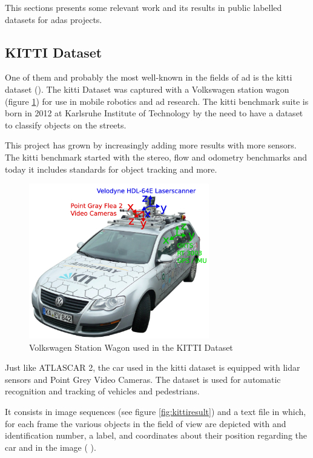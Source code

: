 This sections presents some relevant work and its results in public labelled datasets for \gls{adas} projects.

\subsection{KITTI Dataset}
One of them and probably the most well-known in the fields of \gls{ad} is the \gls{kitti} dataset (\cite{KarlsruheInstituteofTechnology}). The \gls{kitti} Dataset was captured with a Volkswagen station wagon (figure \ref{fig:kitticar}) for use in mobile robotics and \gls{ad} research. The \gls{kitti} benchmark suite is born in 2012 at Karlsruhe Institute of Technology by the need to have a dataset to classify objects on the streets. 

This project has grown by increasingly adding more results with more sensors. The \gls{kitti} benchmark started with the stereo, flow and odometry benchmarks and today it includes standards for object tracking and more. 

\begin{figure}[htp]
	
	\centering
	\includegraphics[width=0.7\textwidth]{capstate/imgs/kitticar}
	
	\caption{Volkswagen Station Wagon used in the KITTI Dataset}
	\label{fig:kitticar}
	
\end{figure}

Just like ATLASCAR 2, the car used in the \gls{kitti} dataset is equipped with \gls{lidar} sensors and Point Grey Video Cameras. The dataset is used for automatic recognition and tracking of vehicles and pedestrians. 

It consists in image sequences (see figure \ref{fig:kittiresult}) and a text file in which, for each frame the various objects in the field of view are depicted with and identification number, a label, and coordinates about their position regarding the car and in the image ( \cite{Geiger}). 

